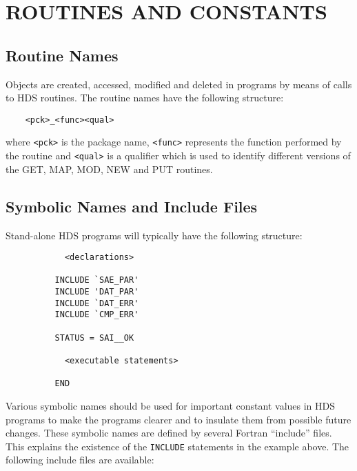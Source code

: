 \section{ROUTINES AND CONSTANTS}

\subsection{Routine Names}

Objects are created, accessed, modified and deleted in programs by means of
calls to HDS routines. The routine names have the following structure: 

\small
\begin{verbatim}
    <pck>_<func><qual>
\end{verbatim}
\normalsize

where \verb+<pck>+ is the package name, \verb+<func>+ represents the
function performed by the routine and \verb+<qual>+ is a qualifier which is
used to identify different versions of the GET, MAP, MOD,
NEW and PUT routines. 

\subsection{Symbolic Names and Include Files}

Stand-alone HDS programs will typically have the following structure: 

\small
\begin{verbatim}
            <declarations>

          INCLUDE `SAE_PAR'
          INCLUDE 'DAT_PAR'
          INCLUDE `DAT_ERR'
          INCLUDE `CMP_ERR'

          STATUS = SAI__OK

            <executable statements>

          END
\end{verbatim}
\normalsize

Various symbolic names should be used for important constant values in HDS
programs to make the programs clearer and to insulate them from possible future
changes. These symbolic names are defined by several Fortran ``include'' files.
This explains the existence of the {\tt INCLUDE} statements in the example
above. The following include files are available: 


